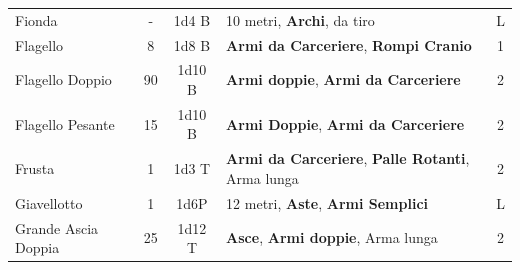 \documentclass[a4paper,11pt,twoside,openany]{book}
\begin{document}
\begin{tabularx}{1\textwidth}{lccXc}
	Fionda& -& 1d4 B& 10 metri, \textbf{Archi}, da tiro& L\\
	Flagello& 8& 1d8 B& \textbf{Armi da Carceriere}, \textbf{Rompi Cranio}& 1\\
	Flagello Doppio& 90 & 1d10 B& \textbf{Armi doppie}, \textbf{Armi da Carceriere}& 2\\
	Flagello Pesante& 15 & 1d10 B& \textbf{Armi Doppie}, \textbf{Armi da Carceriere}& 2\\
	Frusta& 1& 1d3 T& \textbf{Armi da Carceriere}, \textbf{Palle Rotanti}, Arma lunga& 2\\
	Giavellotto& 1& 1d6P& 12 metri, \textbf{Aste}, \textbf{Armi Semplici}& L\\
	Grande Ascia Doppia& 25 & 1d12 T& \textbf{Asce}, \textbf{Armi doppie}, Arma lunga& 2\\


\end{tabularx}

\bigskip
\end{document}
